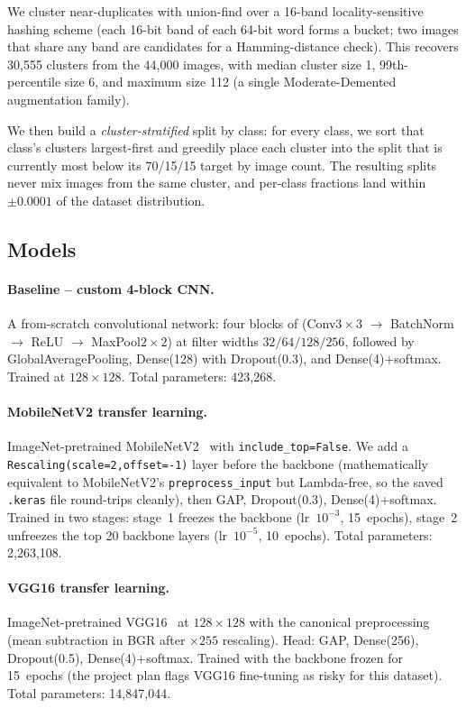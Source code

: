 \documentclass[journal,onecolumn,11pt]{IEEEtran}
\begin{document}
We cluster near-duplicates with union-find over a 16-band locality-sensitive
hashing scheme (each 16-bit band of each 64-bit word forms a bucket;
two images that share any band are candidates for a Hamming-distance check).
This recovers 30{,}555 clusters from the 44{,}000 images, with median cluster
size 1, 99th-percentile size 6, and maximum size 112 (a single Moderate-Demented
augmentation family).

We then build a \emph{cluster-stratified} split by class: for every class,
we sort that class's clusters largest-first and greedily place each cluster
into the split that is currently most below its 70/15/15 target by image
count. The resulting splits never mix images from the same cluster, and
per-class fractions land within $\pm 0.0001$ of the dataset distribution.

\subsection{Models}
\paragraph{Baseline -- custom 4-block CNN.}
A from-scratch convolutional network: four blocks of (Conv$3{\times}3$ $\rightarrow$
BatchNorm $\rightarrow$ ReLU $\rightarrow$ MaxPool$2{\times}2$) at filter widths
$32/64/128/256$, followed by GlobalAveragePooling, Dense(128) with Dropout(0.3),
and Dense(4)$+$softmax. Trained at $128{\times}128$. Total parameters: 423{,}268.

\paragraph{MobileNetV2 transfer learning.}
ImageNet-pretrained MobileNetV2~\cite{sandler2018mobilenetv2} with
\verb|include_top=False|. We add a \verb|Rescaling(scale=2,offset=-1)| layer
before the backbone (mathematically equivalent to MobileNetV2's
\verb|preprocess_input| but Lambda-free, so the saved \verb|.keras| file
round-trips cleanly), then GAP, Dropout(0.3), Dense(4)$+$softmax. Trained
in two stages: stage~1 freezes the backbone (lr~$10^{-3}$, 15~epochs), stage~2
unfreezes the top 20 backbone layers (lr~$10^{-5}$, 10~epochs). Total
parameters: 2{,}263{,}108.

\paragraph{VGG16 transfer learning.}
ImageNet-pretrained VGG16~\cite{simonyan2014vgg} at $128{\times}128$ with
the canonical preprocessing (mean subtraction in BGR after $\times 255$
rescaling). Head: GAP, Dense(256), Dropout(0.5), Dense(4)$+$softmax. Trained
with the backbone frozen for 15~epochs (the project plan flags VGG16
fine-tuning as risky for this dataset). Total parameters: 14{,}847{,}044.
\end{document}
